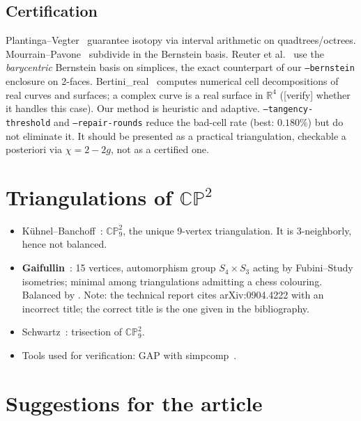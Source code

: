 \documentclass[11pt]{article}
\newcommand{\CP}{\mathbb{CP}}
\newcommand{\verify}{\textcolor{red!70!black}{\textsf{[verify]}}}
\begin{document}
\subsection{Certification}
Plantinga--Vegter~\cite{plantingavegter2004} guarantee isotopy via interval
arithmetic on quadtrees/octrees. Mourrain--Pavone~\cite{mourrainpavone2009}
subdivide in the Bernstein basis. Reuter et al.~\cite{reuter2008} use the
\emph{barycentric} Bernstein basis on simplices, the exact counterpart of
our \texttt{--bernstein} enclosure on 2-faces. Bertini\_real~\cite{bertinireal2017}
computes numerical cell decompositions of real curves and surfaces; a
complex curve is a real surface in $\mathbb R^4$ (\verify{} whether it
handles this case). Our method is heuristic and adaptive.
\texttt{--tangency-threshold} and \texttt{--repair-rounds} reduce the
bad-cell rate (best: $0.180\%$) but do not eliminate it. It should be
presented as a practical triangulation, checkable a posteriori via
$\chi=2-2g$, not as a certified one.

\section{Triangulations of $\CP^2$}

\begin{itemize}[leftmargin=*,itemsep=3pt]
\item Kühnel--Banchoff~\cite{kuhnelbanchoff1983}: $\CP^2_9$, the unique
  9-vertex triangulation. It is $3$-neighborly, hence not balanced.
\item \textbf{Gaifullin}~\cite{gaifullin2009}: 15 vertices, automorphism
  group $S_4\times S_3$ acting by Fubini--Study isometries; minimal among
  triangulations admitting a chess colouring. Balanced by
  . Note: the technical report cites arXiv:0904.4222
  with an incorrect title; the correct title is the one given in the
  bibliography.
\item Schwartz~\cite{schwartz2023}: trisection of $\CP^2_9$.
\item Tools used for verification: GAP with simpcomp~\cite{simpcomp}.
\end{itemize}

\section{Suggestions for the article}
\end{document}

